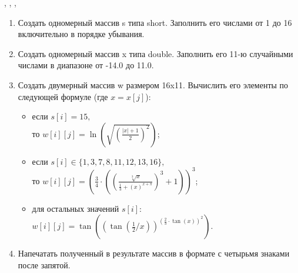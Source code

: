     


    \tableofcontents


    \newpage
    \Chapter{\lab\ \labnumber}{}{}


    \begin{center}
        , , ,
    \end{center}
    \noindent
%

    \begin{enumerate}
        \setlength{\itemsep}{0pt} %
        \setlength{\parskip}{0pt}
        \setlength{\parsep}{0pt}
        \item Создать одномерный массив s типа short. Заполнить его числами от 1 до 16 включительно в порядке убывания.
        \item Создать одномерный массив x типа double. Заполнить его 11-ю случайными числами в диапазоне от -14.0 до 11.0.
        \item Создать двумерный массив w размером 16x11. Вычислить его элементы по следующей формуле (где $x = x[j]$):

        \begin{itemize}
            \setlength{\itemsep}{0pt} %
            \setlength{\parskip}{0pt}
            \setlength{\parsep}{0pt}
            \item если $\displaystyle s[i] = 15\text{,}$\\$\displaystyle \text{то }w[i][j] = \ln{\left(\sqrt{\left(\frac{|x|+1}{2}\right)^{2}}\right)}$;
            \item если $\displaystyle s[i] \in\{1, 3, 7, 8, 11, 12, 13, 16\}\text{,}$\\ $\displaystyle \text{то } w[i][j] = \left(\frac{3}{4}\cdot\left(\left(\frac{\sqrt[3]{x}}{\frac{1}{3}+(x)^{x+\pi}}\right)^{3}+1\right)\right)^{3}$;
            \item  для остальных значений $\displaystyle s[i]:$\\ $\displaystyle w[i][j] = \tan{\left(\left(\tan{\left(\frac{1}{2}/x\right)}\right)^{\left(\frac{2}{3}\cdot\tan{(x)}\right)^{2}}\right)}$.
        \end{itemize}

        \item Напечатать полученный в результате массив в формате с четырьмя знаками после запятой.
    \end{enumerate}


